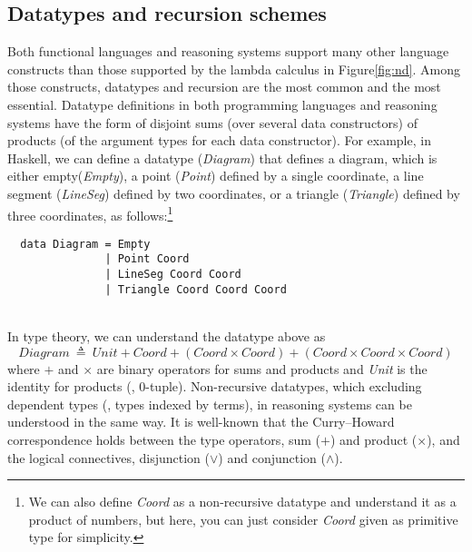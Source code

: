 \subsection{Datatypes and recursion schemes}
\label{ssec:intro:scope:datarec}
Both functional languages and reasoning systems support many other
language constructs than those supported by the lambda calculus
in Figure\;\ref{fig:nd}. Among those constructs, datatypes and
recursion are the most common and the most essential.
Datatype definitions in both programming languages and reasoning systems
have the form of disjoint sums (over several data constructors) of products
(of the argument types for each data constructor). For example, in Haskell,
we can define a datatype (\textit{Diagram}) that defines a diagram,
which is either empty(\textit{Empty}),
a point (\textit{Point}) defined by a single coordinate,
a line segment (\textit{LineSeg}) defined by two coordinates, or
a triangle (\textit{Triangle}) defined by three coordinates,
as follows:\footnote{
        We can also define \textit{Coord} as a non-recursive datatype
        and understand it as a product of numbers, but here, you can just
        consider \textit{Coord} given as primitive type for simplicity.}
\vspace*{-4em}
\begin{singlespace}
\begin{verbatim}
  data Diagram = Empty
               | Point Coord
               | LineSeg Coord Coord
               | Triangle Coord Coord Coord
\end{verbatim}
\end{singlespace}~\vspace*{-2.5em}\\
In type theory, we can understand the datatype above as
\[ \textit{Diagram} ~ \triangleq ~
        \textit{Unit} + \textit{Coord} + (\textit{Coord} \times \textit{Coord})
        + (\textit{Coord} \times \textit{Coord} \times \textit{Coord}) \]
where $+$ and $\times$ are binary operators for sums and products
and \textit{Unit} is the identity for products (\ie, 0-tuple).
Non-recursive datatypes, which excluding dependent types
(\ie, types indexed by terms), in reasoning systems can be understood
in the same way. It is well-known that the Curry--Howard correspondence
holds between the type operators, sum ($+$) and product ($\times$), and
the logical connectives, disjunction ($\lor$) and conjunction ($\land$).

